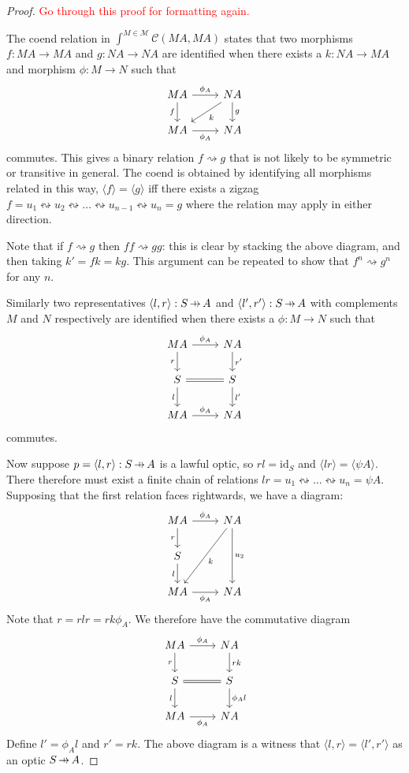 \documentclass[11pt,a4paper]{article}
\theoremstyle{plain}
\theoremstyle{definition}
\newcommand{\C}{\mathscr{C}}
\newcommand{\M}{\mathscr{M}}
\newcommand{\id}{\mathrm{id}}
\newcommand{\hto}{\ensuremath{\,\mathaccent\shortmid\rightarrow\,}}
\newcommand{\todo}[1]{\textcolor{red}{\small #1}}
\begin{document}
\begin{proof}
\todo{Go through this proof for formatting again.}

The coend relation in $\int^{M \in \M} \C(M A, M A)$ states that two morphisms $f : M A \to M A$ and $g : N A \to N A$ are identified when there exists a $k : N A \to M A$ and morphism $\phi : M \to N$ such that
\[
\begin{tikzcd}
M A \ar[r, "\phi_A"] \ar[d, "f", swap] & N A \ar[d, "g"] \ar[dl, "k"] \\
M A \ar[r, "\phi_A", swap] & N A
\end{tikzcd}
\]
commutes. This gives a binary relation $f \rightsquigarrow g$ that is not likely to be symmetric or transitive in general. The coend is obtained by identifying all morphisms related in this way, $\langle f \rangle = \langle g \rangle$ iff there exists a zigzag $f = u_1 \leftrightsquigarrow u_2 \leftrightsquigarrow \dots  \leftrightsquigarrow u_{n-1} \leftrightsquigarrow u_n = g$ where the relation may apply in either direction.

Note that if $f \rightsquigarrow g$ then $ff \rightsquigarrow gg$: this is clear by stacking the above diagram, and then taking $k' = fk = kg$. This argument can be repeated to show that $f^n \rightsquigarrow g^n$ for any $n$.

Similarly two representatives $\langle l, r \rangle : S \hto A$ and $\langle l', r' \rangle : S \hto A$ with complements $M$ and $N$ respectively are identified when there exists a $\phi : M \to N$ such that
\[
\begin{tikzcd}
M A \ar[r, "\phi_A"] \ar[d, "r", swap] & N A \ar[d, "r'"] \\
S \ar[r, equal] \ar[d, "l", swap] & S \ar[d, "l'"]  \\
MA \ar[r, "\phi_A"] & N A
\end{tikzcd}
\]
commutes. 

Now suppose $p = \langle l, r \rangle : S \hto A$ is a lawful optic, so $rl = \id_S$ and $\langle lr \rangle = \langle \psi A\rangle$. There therefore must exist a finite chain of relations $lr = u_1 \leftrightsquigarrow \dots \leftrightsquigarrow u_n = \psi A$.
Supposing that the first relation faces rightwards, we have a diagram:
\[
\begin{tikzcd}
M A \ar[r, "\phi_A"] \ar[d, "r", swap] & N A \ar[dd, "u_2"] \ar[ddl, "k"] \\
S \ar[d,"l",swap] & \\
M A \ar[r, "\phi_A", swap] & N A
\end{tikzcd}
\]
Note that $r = rlr = rk\phi_A$. We therefore have the commutative diagram
\[
\begin{tikzcd}
M A \ar[r, "\phi_A"] \ar[d, "r", swap] & N A \ar[d, "rk"] \\
S \ar[r, equal] \ar[d, "l", swap] & S \ar[d, "\phi_Al"] \\
MA \ar[r, "\phi_A", swap] & N A
\end{tikzcd}
\]
Define $l' = \phi_A l$ and $r' = rk$. The above diagram is a witness that $\langle l, r \rangle = \langle l', r' \rangle$ as an optic $S \hto A$.


\end{proof}
\end{document}
